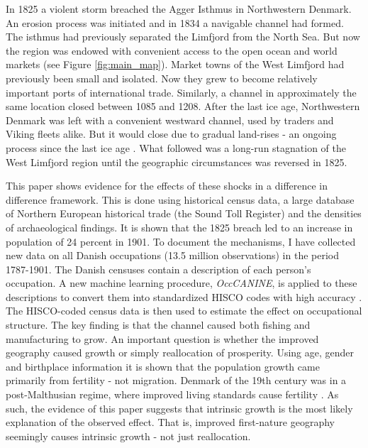 \documentclass[11pt]{article}
\begin{document}
In 1825 a violent storm breached the Agger Isthmus in Northwestern Denmark. An erosion process was initiated and in 1834 a navigable channel had formed. The isthmus had previously separated the Limfjord from the North Sea. But now the region was endowed with convenient access to the open ocean and world markets (see Figure \ref{fig:main_map}). Market towns of the West Limfjord had previously been small and isolated. Now they grew to become relatively important ports of international trade. Similarly, a channel in approximately the same location closed between 1085 and 1208. After the last ice age, Northwestern Denmark was left with a convenient westward channel, used by traders and Viking fleets alike. But it would close due to gradual land-rises - an ongoing process since the last ice age \citep{Christensen2004}. What followed was a long-run stagnation of the West Limfjord region until the geographic circumstances was reversed in 1825.

This paper shows evidence for the effects of these shocks in a difference in difference framework. This is done using historical census data, a large database of Northern European historical trade (the Sound Toll Register) and the densities of archaeological findings. It is shown that the 1825 breach led to an increase in population of 24 percent in 1901. To document the mechanisms, I have collected new data on all Danish occupations (13.5 million observations) in the period 1787-1901. The Danish censuses contain a description of each person's occupation. A new machine learning procedure, \textit{OccCANINE}, is applied to these descriptions to convert them into standardized HISCO codes with high accuracy \citep{dahl2024breaking}. The HISCO-coded census data is then used to estimate the effect on occupational structure. The key finding is that the channel caused both fishing and manufacturing to grow. An important question is whether the improved geography caused growth or simply reallocation of prosperity. Using age, gender and birthplace information it is shown that the population growth came primarily from fertility - not migration. Denmark of the 19th century was in a post-Malthusian regime, where improved living standards cause fertility \citep{Jensen2022, Galor2011}. As such, the evidence of this paper suggests that intrinsic growth is the most likely explanation of the observed effect. That is, improved first-nature geography seemingly causes intrinsic growth - not just reallocation.
\end{document}
